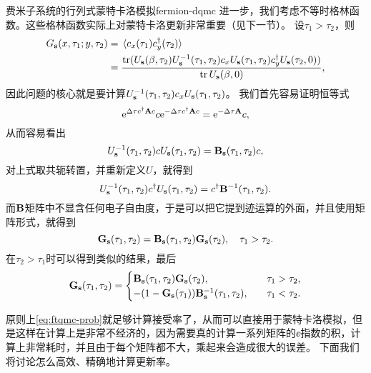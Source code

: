 \begin{back}{费米子系统的行列式蒙特卡洛模拟}{fermion-dqmc}
    进一步，我们考虑不等时格林函数。这些格林函数实际上对蒙特卡洛更新非常重要（见下一节）。
    设$\tau_1 > \tau_2$，则
    \[
        \begin{aligned}
            G_{\vb{s}}(x, \tau_1; y, \tau_2) &= \expval*{{c}_x(\tau_1) {c}^\dagger_y(\tau_2)} \\
            &= \frac{\trace ({U}_{\vb{s}}(\beta, \tau_2) {U}_{\vb{s}}^{-1}(\tau_1, \tau_2) {c}_x {U}_{\vb{s}}(\tau_1, \tau_2) {c}_y^\dagger {U}_{\vb{s}}(\tau_2, 0))}{\trace {U}_{\vb{s}}(\beta, 0)},
        \end{aligned}
    \]
    因此问题的核心就是要计算${U}_{\vb{s}}^{-1}(\tau_1, \tau_2) {c}_x {U}_{\vb{s}}(\tau_1, \tau_2)$。
    我们首先容易证明恒等式
    \[
        \mathrm{e}^{\Delta \tau {c}^\dagger \vb{A} {c}} {c} \mathrm{e}^{- \Delta \tau {c}^\dagger \vb{A} {c}} = \mathrm{e}^{- \Delta \tau \vb{A}} {c},
    \]
    从而容易看出
    \[
        {U}_{\vb{s}}^{-1}(\tau_1, \tau_2) {c} {U}_{\vb{s}}(\tau_1, \tau_2) = \vb{B}_{\vb{s}}(\tau_1, \tau_2) {c},
    \]
    对上式取共轭转置，并重新定义${U}$，就得到
    \[
        {U}_{\vb{s}}^{-1}(\tau_1, \tau_2) {c}^\dagger {U}_{\vb{s}}(\tau_1, \tau_2) = {c}^\dagger \vb{B}^{-1}(\tau_1, \tau_2).
    \]
    而$\vb{B}$矩阵中不显含任何电子自由度，于是可以把它提到迹运算的外面，并且使用矩阵形式，就得到
    \[
        \vb{G}_{\vb{s}}(\tau_1, \tau_2) = \vb{B}_{\vb{s}}(\tau_1, \tau_2) \vb{G}_{\vb{s}}(\tau_2), \quad \tau_1 > \tau_2.
    \]
    在$\tau_2 > \tau_1$时可以得到类似的结果，最后
    \begin{equation}
        \vb{G}_{\vb{s}}(\tau_1, \tau_2) = \begin{cases}
            \vb{B}_{\vb{s}}(\tau_1, \tau_2) \vb{G}_{\vb{s}}(\tau_2), \quad &\tau_1 > \tau_2, \\
            - (1 - \vb{G}_{\vb{s}}(\tau_1)) \vb{B}^{-1}_{\vb{s}}(\tau_1, \tau_2) , \quad &\tau_1 < \tau_2.
        \end{cases}
    \end{equation}

    原则上\eqref{eq:ftqmc-prob}就足够计算接受率了，从而可以直接用于蒙特卡洛模拟，但是这样在计算上是非常不经济的，因为需要真的计算一系列矩阵的$\ee$指数的积，计算上非常耗时，并且由于每个矩阵都不大，乘起来会造成很大的误差。
    下面我们将讨论怎么高效、精确地计算更新率。


\end{back}
